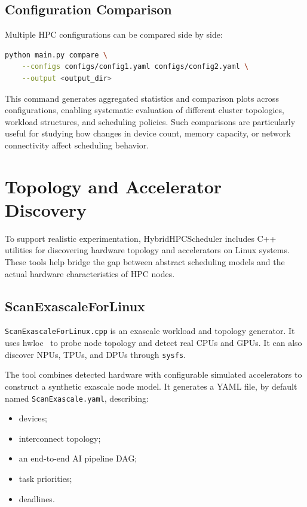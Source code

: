 \documentclass[conference]{IEEEtran}
\begin{document}
\subsection{Configuration Comparison}
Multiple HPC configurations can be compared side by side:
\begin{lstlisting}[language=bash]
python main.py compare \
    --configs configs/config1.yaml configs/config2.yaml \
    --output <output_dir>
\end{lstlisting}

This command generates aggregated statistics and comparison plots across
configurations, enabling systematic evaluation of different cluster topologies,
workload structures, and scheduling policies. Such comparisons are particularly
useful for studying how changes in device count, memory capacity, or network
connectivity affect scheduling behavior.

\section{Topology and Accelerator Discovery}
To support realistic experimentation, HybridHPCScheduler includes C++ utilities
for discovering hardware topology and accelerators on Linux systems. These
tools help bridge the gap between abstract scheduling models and the actual
hardware characteristics of HPC nodes.

\subsection{ScanExascaleForLinux}
\texttt{ScanExascaleForLinux.cpp} is an exascale workload and topology
generator. It uses hwloc~\cite{hwloc} to probe node topology and detect real
CPUs and GPUs. It can also discover NPUs, TPUs, and DPUs through
\texttt{sysfs}.

The tool combines detected hardware with configurable simulated accelerators to
construct a synthetic exascale node model. It generates a YAML file, by default
named \texttt{ScanExascale.yaml}, describing:
\begin{itemize}
    \item devices;
    \item interconnect topology;
    \item an end-to-end AI pipeline DAG;
    \item task priorities;
    \item deadlines.
\end{itemize}
\end{document}
